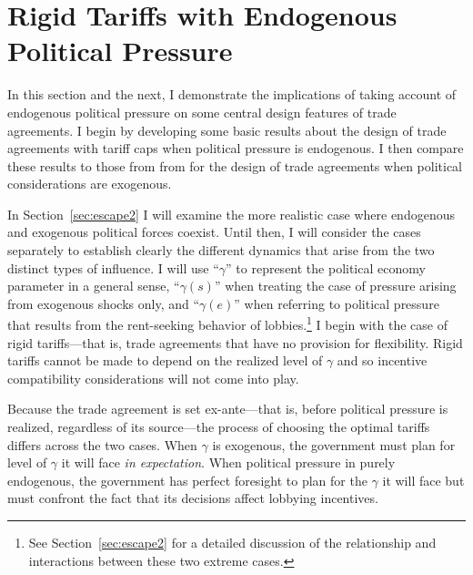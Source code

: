 \documentclass[12pt]{article}
\newcommand{\ga}{\gamma}
\begin{document}
\section{Rigid Tariffs with Endogenous Political Pressure}
\label{sec:rigid}
In this section and the next, I demonstrate the implications of taking account of endogenous political pressure on some central design features of trade agreements. I begin by developing some basic results about the design of trade agreements with tariff caps when political pressure is endogenous. I then compare these results to those from from \Textcite{bs2005} for the design of trade agreements when political considerations are exogenous.

In Section~\ref{sec:escape2} I will examine the more realistic case where endogenous and exogenous political forces coexist. Until then, I will consider the cases separately to establish clearly the different dynamics that arise from the two distinct types of influence. I will use ``$\ga$'' to represent the political economy parameter in a general sense, ``$\ga(s)$'' when treating the case of pressure arising from exogenous shocks only, and ``$\ga(e)$'' when referring to political pressure that results from the rent-seeking behavior of lobbies.\footnote{See Section~\ref{sec:escape2} for a detailed discussion of the relationship and interactions between these two extreme cases.} I begin with the case of rigid tariffs---that is, trade agreements that have no provision for flexibility. Rigid tariffs cannot be made to depend on the realized level of $\ga$ and so incentive compatibility considerations will not come into play.


Because the trade agreement is set ex-ante---that is, before political pressure is realized, regardless of its source---the process of choosing the optimal tariffs differs across the two cases. When $\ga$ is exogenous, the government must plan for level of $\ga$ it will face \textit{in expectation}. When political pressure in purely endogenous, the government has perfect foresight to plan for the $\ga$ it will face but must confront the fact that its decisions affect lobbying incentives.
\end{document}
